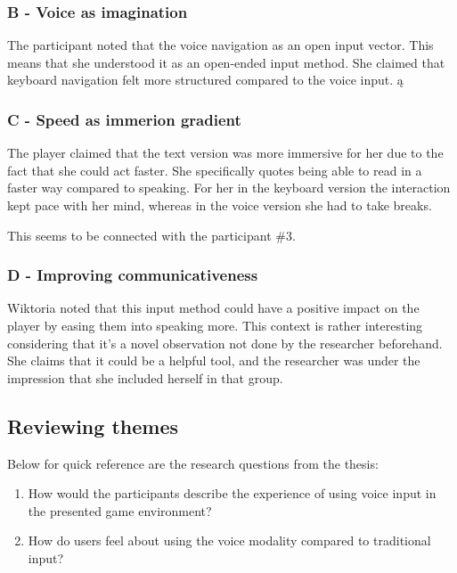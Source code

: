 \subsubsection{B - Voice as imagination}

The participant noted that the voice navigation as an open input vector. This means that she understood it as an open-ended input method. She claimed that keyboard navigation felt more structured compared to the voice input. ą


\subsubsection{C - Speed as immerion gradient}

The player claimed that the text version was more immersive for her due to the fact that she could act faster. She specifically quotes being able to read in a faster way compared to speaking. For her in the keyboard version the interaction kept pace with her mind, whereas in the voice version she had to take breaks.

This seems to be connected with the participant \#3.


\subsubsection{D - Improving communicativeness}

Wiktoria noted that this input method could have a positive impact on the player by easing them into speaking more. This context is rather interesting considering that it's a novel observation not done by the researcher beforehand. She claims that it could be a helpful tool, and the researcher was under the impression that she included herself in that group.


\subsection{Reviewing themes}




Below for quick reference are the research questions from the thesis: 

\begin{enumerate}
    \item How would the participants describe the experience of using voice input in the presented
game environment?
    \item How do users feel about using the voice modality compared to traditional input?
\end{enumerate}

